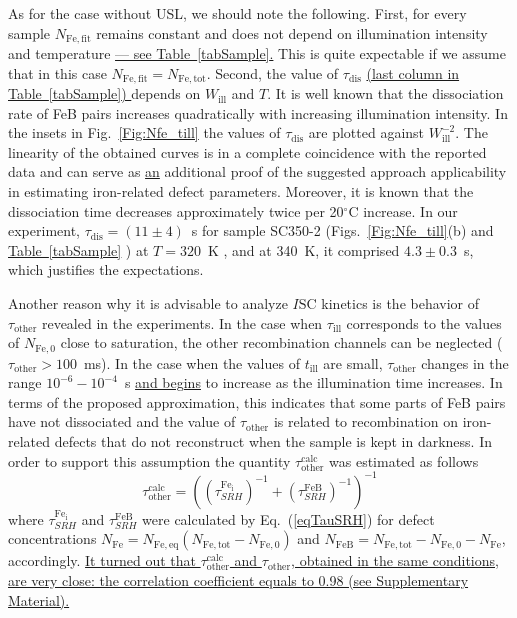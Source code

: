 \documentclass[%
 aip,jap,
 amsmath,amssymb,
 reprint,%
]{revtex4-1}
\begin{document}
As for the case without USL, we should note the following.
First, for every sample $N_\mathrm{Fe,fit}$ remains constant and does not depend on illumination intensity and temperature
\textcolor[rgb]{0.00,0.07,1.00}{\uline{
--- see Table~\ref{tabSample}.}}
This is quite expectable if we assume that
in this case $N_\mathrm{Fe,fit}=N_\mathrm{Fe,tot}$.
Second, the value of $\tau_\mathrm{dis}$
\textcolor[rgb]{0.00,0.07,1.00}{\uline{
(last column in Table~\ref{tabSample})
}}
depends on $W_\mathrm{ill}$ and $T$.
It is well known \cite{Schmidt2019,FeBLight2,FeBKin2019} that the dissociation rate of FeB pairs increases quadratically with increasing illumination intensity.
In the insets in Fig.~\ref{Fig:Nfe_till} the values of $\tau_\mathrm{dis}$
are plotted against $W_\mathrm{ill}^{-2}$.
The linearity of the obtained curves is in a complete coincidence
with the reported data and can serve as \textcolor[rgb]{0.00,0.07,1.00}{\uline{an}} additional proof of the suggested approach
applicability in estimating iron-related defect parameters.
Moreover, it is known \cite{Lagowskii1993} that the dissociation time decreases approximately twice per 20$^\circ$C increase.
In our experiment, $\tau_\mathrm{dis}=(11\pm4)$~s for sample SC350-2
(Figs.~\ref{Fig:Nfe_till}(b) and
\textcolor[rgb]{0.00,0.07,1.00}{\uline{
Table~\ref{tabSample}}}
) at $T=320$~K , and at 340~K,
it comprised $4.3\pm0.3$~s, which justifies the expectations.

Another reason why it is advisable to analyze $I\mathrm{SC}$ kinetics is the behavior of
$\tau_\mathrm{other}$ revealed in the experiments.
In the case when $\tau_\mathrm{ill}$ corresponds to the values of $N_\mathrm{Fe,0}$ close to saturation, the other recombination channels  can be neglected ($\tau_\mathrm{other}> 100$~ms).
In the case when the values of $t_\mathrm{ill}$ are small,
$\tau_\mathrm{other}$ changes in the range $10^{-6}-10^{-4}$~s \textcolor[rgb]{0.00,0.07,1.00}{\uline{and begins}} to increase as the illumination time increases.
In terms of the proposed approximation, this indicates that some parts of FeB pairs have not dissociated and the value of $\tau_\mathrm{other}$ is related
to recombination on iron-related defects that do not reconstruct when the sample is kept in darkness. In order to support this assumption the quantity
$\tau_\mathrm{other}^\mathrm{calc}$
was estimated as follows
\begin{equation*}
\tau_\mathrm{other}^\mathrm{calc}=\left(\left(\tau_{SRH}^\mathrm{Fe_i}\right)^{-1}
+\left(\tau_{SRH}^\mathrm{FeB}\right)^{-1}\right)^{-1}
\end{equation*}
where
$\tau_{SRH}^\mathrm{Fe_i}$ and $\tau_{SRH}^\mathrm{FeB}$
were calculated by Eq.~(\ref{eqTauSRH}) for defect concentrations
$N_\mathrm{Fe}=N_\mathrm{Fe,eq}(N_\mathrm{Fe,tot}-N_\mathrm{Fe,0})$
and $N_\mathrm{FeB}= N_\mathrm{Fe,tot}-N_\mathrm{Fe,0}- N_\mathrm{Fe}$, accordingly.
 \textcolor[rgb]{0.00,0.07,1.00}{\uline{
It turned out that $\tau_\mathrm{other}^\mathrm{calc}$ and
$\tau_\mathrm{other}$, obtained in the same conditions, are very close:
the correlation coefficient equals to 0.98 (see Supplementary Material).
}}
\end{document}
